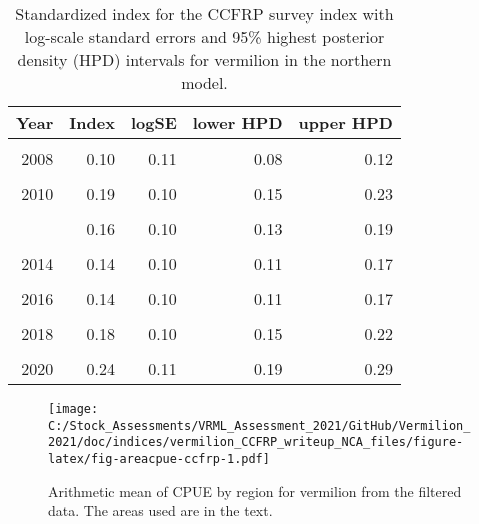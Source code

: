 \documentclass[
]{article}
\begin{document}
\begin{table}

\caption{\label{tab:tab-index-ccfrp}Standardized index for the CCFRP survey index with log-scale standard errors and 95\% highest
       posterior density (HPD) intervals for vermilion in the northern model.}
\centering
\begin{tabular}[t]{rrrrr}
\toprule
Year & Index & logSE & lower HPD & upper HPD\\
\midrule
\cellcolor{gray!6}{2007} & \cellcolor{gray!6}{0.11} & \cellcolor{gray!6}{0.13} & \cellcolor{gray!6}{0.09} & \cellcolor{gray!6}{0.14}\\
2008 & 0.10 & 0.11 & 0.08 & 0.12\\
\cellcolor{gray!6}{2009} & \cellcolor{gray!6}{0.16} & \cellcolor{gray!6}{0.11} & \cellcolor{gray!6}{0.13} & \cellcolor{gray!6}{0.19}\\
2010 & 0.19 & 0.10 & 0.15 & 0.23\\
\cellcolor{gray!6}{2011} & \cellcolor{gray!6}{0.16} & \cellcolor{gray!6}{0.10} & \cellcolor{gray!6}{0.13} & \cellcolor{gray!6}{0.19}\\
\addlinespace
2012 & 0.16 & 0.10 & 0.13 & 0.19\\
\cellcolor{gray!6}{2013} & \cellcolor{gray!6}{0.08} & \cellcolor{gray!6}{0.12} & \cellcolor{gray!6}{0.06} & \cellcolor{gray!6}{0.10}\\
2014 & 0.14 & 0.10 & 0.11 & 0.17\\
\cellcolor{gray!6}{2015} & \cellcolor{gray!6}{0.19} & \cellcolor{gray!6}{0.13} & \cellcolor{gray!6}{0.14} & \cellcolor{gray!6}{0.24}\\
2016 & 0.14 & 0.10 & 0.11 & 0.17\\
\addlinespace
\cellcolor{gray!6}{2017} & \cellcolor{gray!6}{0.14} & \cellcolor{gray!6}{0.10} & \cellcolor{gray!6}{0.11} & \cellcolor{gray!6}{0.17}\\
2018 & 0.18 & 0.10 & 0.15 & 0.22\\
\cellcolor{gray!6}{2019} & \cellcolor{gray!6}{0.22} & \cellcolor{gray!6}{0.10} & \cellcolor{gray!6}{0.18} & \cellcolor{gray!6}{0.26}\\
2020 & 0.24 & 0.11 & 0.19 & 0.29\\
\bottomrule
\end{tabular}
\end{table}

\FloatBarrier

\begin{figure}
\centering
\texttt{[image: C:/Stock\_Assessments/VRML\_Assessment\_2021/GitHub/Vermilion\_2021/doc/indices/vermilion\_CCFRP\_writeup\_NCA\_files/figure-latex/fig-areacpue-ccfrp-1.pdf]}
\caption{\label{fig:fig-areacpue-ccfrp}Arithmetic mean of CPUE by region for vermilion from the filtered data. The areas used are in the text.}
\end{figure}
\end{document}
